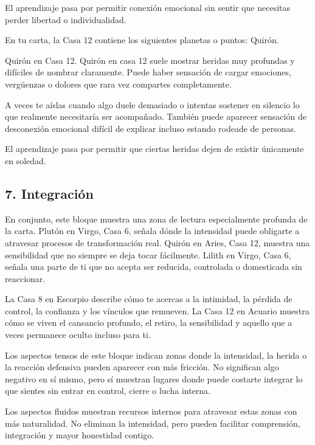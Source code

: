 \documentclass[11pt,a4paper]{article}
\begin{document}
El aprendizaje pasa por permitir conexión emocional sin sentir que necesitas perder libertad o individualidad.

En tu carta, la Casa 12 contiene los siguientes planetas o puntos: Quirón.

Quirón en Casa 12.
Quirón en casa 12 suele mostrar heridas muy profundas y difíciles de nombrar claramente. Puede haber sensación de cargar emociones, vergüenzas o dolores que rara vez compartes completamente.

A veces te aíslas cuando algo duele demasiado o intentas sostener en silencio lo que realmente necesitaría ser acompañado. También puede aparecer sensación de desconexión emocional difícil de explicar incluso estando rodeade de personas.

El aprendizaje pasa por permitir que ciertas heridas dejen de existir únicamente en soledad.

\vspace{0.4cm}

\subsection{7. Integración}

En conjunto, este bloque muestra una zona de lectura especialmente profunda de la carta. Plutón en Virgo, Casa 6, señala dónde la intensidad puede obligarte a atravesar procesos de transformación real. Quirón en Aries, Casa 12, muestra una sensibilidad que no siempre se deja tocar fácilmente. Lilith en Virgo, Casa 6, señala una parte de ti que no acepta ser reducida, controlada o domesticada sin reaccionar.

La Casa 8 en Escorpio describe cómo te acercas a la intimidad, la pérdida de control, la confianza y los vínculos que remueven. La Casa 12 en Acuario muestra cómo se viven el cansancio profundo, el retiro, la sensibilidad y aquello que a veces permanece oculto incluso para ti.

Los aspectos tensos de este bloque indican zonas donde la intensidad, la herida o la reacción defensiva pueden aparecer con más fricción. No significan algo negativo en sí mismo, pero sí muestran lugares donde puede costarte integrar lo que sientes sin entrar en control, cierre o lucha interna.

Los aspectos fluidos muestran recursos internos para atravesar estas zonas con más naturalidad. No eliminan la intensidad, pero pueden facilitar comprensión, integración y mayor honestidad contigo.
\end{document}
